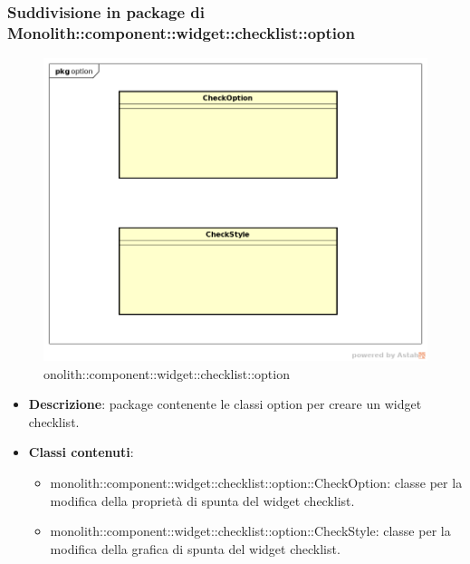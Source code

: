 \subsubsection{Suddivisione in package  di Monolith::component::widget::checklist::option}
\label{monolith::component::widget::checklist::option}
\begin{figure}[H]
	\centering
	\includegraphics[scale=0.5]{Sezioni/imgPackage/component_widget_checklist_option.png}
	\caption{onolith::component::widget::checklist::option}
\end{figure}
\begin{itemize}
	\item{\textbf{Descrizione}}: package contenente le classi option per creare un widget checklist.
	\item{\textbf{Classi contenuti}}:
	\begin{itemize}
	\item{monolith::component::widget::checklist::option::CheckOption}: classe per la modifica della proprietà di spunta del widget checklist.
	\item{monolith::component::widget::checklist::option::CheckStyle}: classe per la modifica della grafica di spunta del widget checklist.
	\end{itemize}
\end{itemize}


